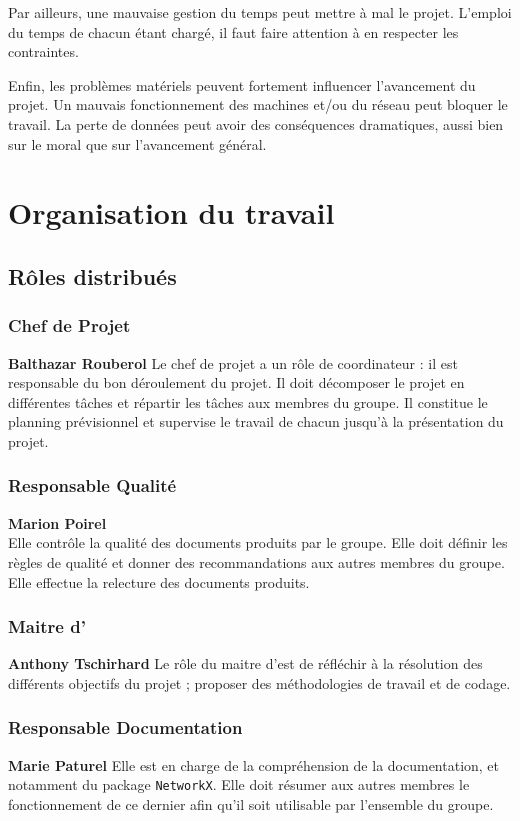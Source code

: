 Par ailleurs, une mauvaise gestion du temps peut mettre à mal le projet. L'emploi du temps de chacun étant chargé, il faut faire attention à en respecter les contraintes.

Enfin, les problèmes matériels peuvent fortement influencer l'avancement du projet. Un mauvais fonctionnement des machines et/ou du réseau peut bloquer le travail. La perte de données peut avoir des conséquences dramatiques, aussi bien sur le moral que sur l'avancement général.

\section{Organisation du travail}
\subsection{Rôles distribués}

\subsubsection{Chef de Projet}
\textbf{Balthazar Rouberol}
Le chef de projet a un rôle de coordinateur : il est responsable du bon déroulement du projet. Il doit décomposer le projet en différentes tâches et répartir les tâches aux membres du groupe. Il constitue le planning prévisionnel et supervise le travail de chacun jusqu'à la présentation du projet.
  
\subsubsection{Responsable Qualité}
\textbf{Marion Poirel}\\
Elle contrôle la qualité des documents produits par le groupe. Elle doit définir les règles de qualité et donner des recommandations aux autres membres du groupe. Elle effectue la relecture des documents produits.

\subsubsection{Maitre d'\oeuvre}
\textbf{Anthony Tschirhard}
Le rôle du maitre d'\oeuvre est de réfléchir à la résolution des différents objectifs du projet ; proposer des méthodologies de travail et de codage.

\subsubsection{Responsable Documentation}
\textbf{Marie Paturel}
Elle est en charge de la compréhension de la documentation, et notamment du package \verb?NetworkX?. Elle doit résumer aux autres membres le fonctionnement de ce dernier afin qu'il soit utilisable par l'ensemble du groupe.


